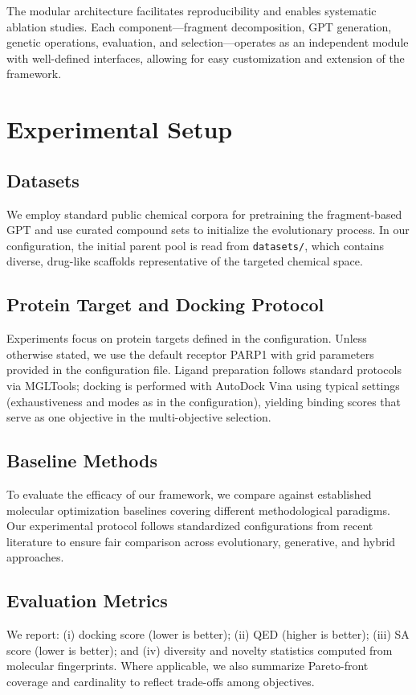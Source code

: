 \documentclass[lettersize,journal]{IEEEtran}
\begin{document}
The modular architecture facilitates reproducibility and enables systematic ablation studies. Each component—fragment decomposition, GPT generation, genetic operations, evaluation, and selection—operates as an independent module with well-defined interfaces, allowing for easy customization and extension of the framework.


\section{Experimental Setup}
\subsection{Datasets}
We employ standard public chemical corpora for pretraining the fragment-based GPT and use curated compound sets to initialize the evolutionary process. In our configuration, the initial parent pool is read from \texttt{datasets/}, which contains diverse, drug-like scaffolds representative of the targeted chemical space.
\subsection{Protein Target and Docking Protocol}
Experiments focus on protein targets defined in the configuration. Unless otherwise stated, we use the default receptor PARP1 with grid parameters provided in the configuration file. Ligand preparation follows standard protocols via MGLTools; docking is performed with AutoDock Vina using typical settings (exhaustiveness and modes as in the configuration), yielding binding scores that serve as one objective in the multi-objective selection.
\subsection{Baseline Methods}
To evaluate the efficacy of our framework, we compare against established molecular optimization baselines covering different methodological paradigms. Our experimental protocol follows standardized configurations from recent literature \cite{fuReinforcedGeneticAlgorithm} to ensure fair comparison across evolutionary, generative, and hybrid approaches.
\subsection{Evaluation Metrics}
We report: (i) docking score (lower is better); (ii) QED (higher is better); (iii) SA score (lower is better); and (iv) diversity and novelty statistics computed from molecular fingerprints. Where applicable, we also summarize Pareto-front coverage and cardinality to reflect trade-offs among objectives.
\end{document}
